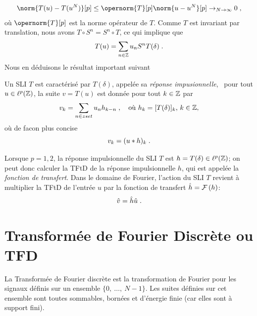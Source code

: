 \[
\norm{T(u) - T(u^N)}[p] \leq \opernorm{T}[p] \norm{u-u^N}[p] \to_{N \to \infty} 0 \eqsp,
\]
où $\opernorm{T}[p]$ est la norme opérateur de $T$. Comme $T$ est invariant par translation, nous avons $T \circ S^n= S^n \circ T$, ce qui implique que
\begin{equation}
\label{eq:action-operateur-2}
T(u)= \sum_{n \in \mathbb{Z}} u_n S^n T(\delta) \;.
\end{equation}
Nous en déduisons le résultat important suivant
\begin{theorem}
\label{theo:caracterisation-SLI}
Un SLI $T$ est caractérisé par $T(\delta)$, appelée sa \emph{réponse impusionnelle}, \ie\ pour tout $ u \in \ell^p(\mathbb{Z})$, la suite  $v = T(u)$ est donnée pour tout $k \in \mathbb{Z}$ par
\[
v_k = \sum_{n \in zset} u_n h_{k-n} \;, \quad \text{où $h_{k} = [T(\delta)]_{k}$, $k \in \mathbb{Z}$},
\]
où de facon plus concise
\[
v_k= (u * h)_k \;.
\]
\end{theorem}
Lorsque $p=1,2$, la réponse impulsionnelle du SLI $T$ est $h=T(\delta) \in \ell^p(\mathbb{Z})$; on peut donc calculer la TFtD de la réponse impulsionnelle $h$, qui est appelée la \emph{fonction de transfert}. Dans le domaine de Fourier, l'action du SLI $T$ revient à multiplier la TFtD de l'entrée $u$ par la fonction de transfert $\hat{h}= \mathcal{F}\left( h \right)$:
\[
\hat{v}= \hat{h} \hat{u} \;.
\]  

\section{Transform\'{e}e de Fourier Discr\`{e}te ou TFD}
La Transform\'{e}e de Fourier discr\`{e}te est la transformation de Fourier pour les signaux d\'{e}finis sur un ensemble $\{0,\ \ldots,\ N-1\}$. Les suites d\'{e}finies sur cet ensemble sont toutes sommables, born\'{e}es et d'\'{e}nergie finie (car elles sont \`{a} support fini).

